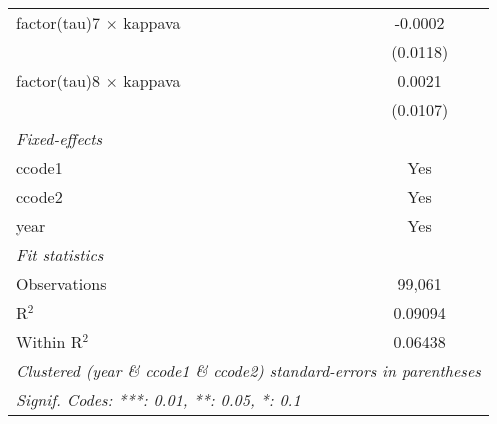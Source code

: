 \begin{tabular}{lc}
   factor(tau)7 $\times$ kappava   & -0.0002\\   
                                   & (0.0118)\\   
   factor(tau)8 $\times$ kappava   & 0.0021\\   
                                   & (0.0107)\\   
   \midrule
   \emph{Fixed-effects}\\
   ccode1                          & Yes\\  
   ccode2                          & Yes\\  
   year                            & Yes\\  
   \midrule
   \emph{Fit statistics}\\
   Observations                    & 99,061\\  
   R$^2$                           & 0.09094\\  
   Within R$^2$                    & 0.06438\\  
   \midrule \midrule
   \multicolumn{2}{l}{\emph{Clustered (year \& ccode1 \& ccode2) standard-errors in parentheses}}\\
   \multicolumn{2}{l}{\emph{Signif. Codes: ***: 0.01, **: 0.05, *: 0.1}}\\
\end{tabular}
\par\endgroup



